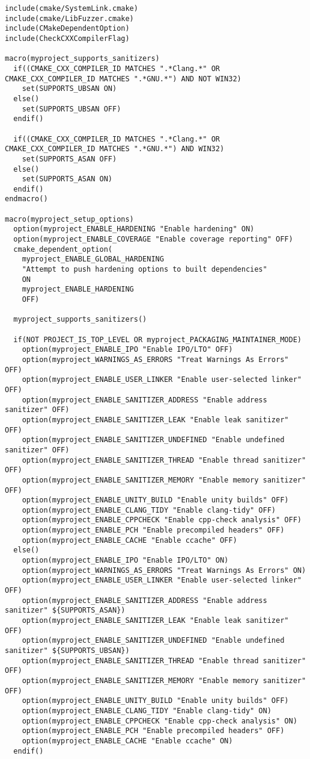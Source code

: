 \begin{verbatim}
include(cmake/SystemLink.cmake)
include(cmake/LibFuzzer.cmake)
include(CMakeDependentOption)
include(CheckCXXCompilerFlag)

macro(myproject_supports_sanitizers)
  if((CMAKE_CXX_COMPILER_ID MATCHES ".*Clang.*" OR CMAKE_CXX_COMPILER_ID MATCHES ".*GNU.*") AND NOT WIN32)
    set(SUPPORTS_UBSAN ON)
  else()
    set(SUPPORTS_UBSAN OFF)
  endif()

  if((CMAKE_CXX_COMPILER_ID MATCHES ".*Clang.*" OR CMAKE_CXX_COMPILER_ID MATCHES ".*GNU.*") AND WIN32)
    set(SUPPORTS_ASAN OFF)
  else()
    set(SUPPORTS_ASAN ON)
  endif()
endmacro()

macro(myproject_setup_options)
  option(myproject_ENABLE_HARDENING "Enable hardening" ON)
  option(myproject_ENABLE_COVERAGE "Enable coverage reporting" OFF)
  cmake_dependent_option(
    myproject_ENABLE_GLOBAL_HARDENING
    "Attempt to push hardening options to built dependencies"
    ON
    myproject_ENABLE_HARDENING
    OFF)

  myproject_supports_sanitizers()

  if(NOT PROJECT_IS_TOP_LEVEL OR myproject_PACKAGING_MAINTAINER_MODE)
    option(myproject_ENABLE_IPO "Enable IPO/LTO" OFF)
    option(myproject_WARNINGS_AS_ERRORS "Treat Warnings As Errors" OFF)
    option(myproject_ENABLE_USER_LINKER "Enable user-selected linker" OFF)
    option(myproject_ENABLE_SANITIZER_ADDRESS "Enable address sanitizer" OFF)
    option(myproject_ENABLE_SANITIZER_LEAK "Enable leak sanitizer" OFF)
    option(myproject_ENABLE_SANITIZER_UNDEFINED "Enable undefined sanitizer" OFF)
    option(myproject_ENABLE_SANITIZER_THREAD "Enable thread sanitizer" OFF)
    option(myproject_ENABLE_SANITIZER_MEMORY "Enable memory sanitizer" OFF)
    option(myproject_ENABLE_UNITY_BUILD "Enable unity builds" OFF)
    option(myproject_ENABLE_CLANG_TIDY "Enable clang-tidy" OFF)
    option(myproject_ENABLE_CPPCHECK "Enable cpp-check analysis" OFF)
    option(myproject_ENABLE_PCH "Enable precompiled headers" OFF)
    option(myproject_ENABLE_CACHE "Enable ccache" OFF)
  else()
    option(myproject_ENABLE_IPO "Enable IPO/LTO" ON)
    option(myproject_WARNINGS_AS_ERRORS "Treat Warnings As Errors" ON)
    option(myproject_ENABLE_USER_LINKER "Enable user-selected linker" OFF)
    option(myproject_ENABLE_SANITIZER_ADDRESS "Enable address sanitizer" ${SUPPORTS_ASAN})
    option(myproject_ENABLE_SANITIZER_LEAK "Enable leak sanitizer" OFF)
    option(myproject_ENABLE_SANITIZER_UNDEFINED "Enable undefined sanitizer" ${SUPPORTS_UBSAN})
    option(myproject_ENABLE_SANITIZER_THREAD "Enable thread sanitizer" OFF)
    option(myproject_ENABLE_SANITIZER_MEMORY "Enable memory sanitizer" OFF)
    option(myproject_ENABLE_UNITY_BUILD "Enable unity builds" OFF)
    option(myproject_ENABLE_CLANG_TIDY "Enable clang-tidy" ON)
    option(myproject_ENABLE_CPPCHECK "Enable cpp-check analysis" ON)
    option(myproject_ENABLE_PCH "Enable precompiled headers" OFF)
    option(myproject_ENABLE_CACHE "Enable ccache" ON)
  endif()


\end{verbatim}
